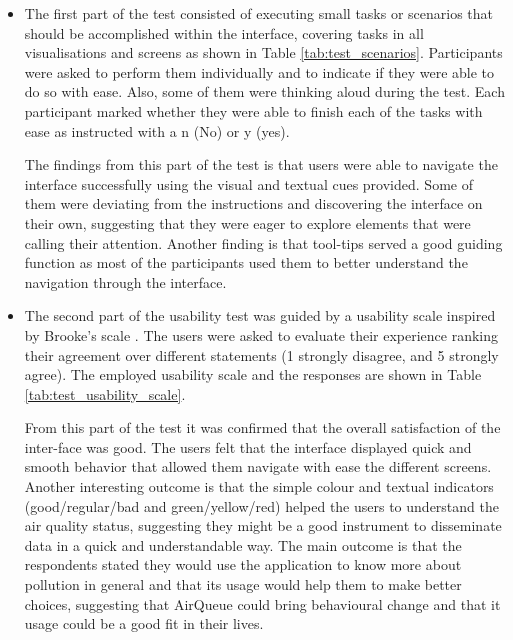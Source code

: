 \begin{itemize}

	\item  The first part of the test consisted of executing small tasks or scenarios that should be accomplished within the interface, covering tasks in all visualisations and screens as shown in Table \ref{tab:test_scenarios}. Participants were asked to perform them individually and to indicate if they were able to do so with ease. Also, some of them were thinking aloud during the test. Each participant marked whether they were able to finish each of the tasks with ease as instructed with a n (No) or y (yes). 

The findings from this part of the test is that users were able to navigate the interface successfully using the visual and textual cues provided. Some of them were deviating from the instructions and discovering the interface on their own, suggesting that they were eager to explore elements that were calling their attention. Another finding is that tool-tips served a good guiding function as most of the participants used them to better understand the navigation through the interface.

	\item The second part of the usability test was guided by a usability scale inspired by Brooke's scale \cite{Brooke1996}. The users were asked to evaluate their experience ranking their agreement over different statements (1 strongly disagree, and 5 strongly agree). The employed usability scale and the responses are shown in Table \ref{tab:test_usability_scale}. 


From this part of the test it was confirmed that the overall satisfaction of the inter-face was good. The users felt that the interface displayed quick and smooth behavior that allowed them navigate with ease the different screens. Another interesting outcome is that the simple colour and textual indicators (good/regular/bad and green/yellow/red) helped the users to understand the air quality status, suggesting they might be a good instrument to disseminate data in a quick and understandable way. The main outcome is that the respondents stated they would use the application to know more about pollution in general and that its usage would help them to make better choices, suggesting that AirQueue could bring behavioural change and that it usage could be a good fit in their lives.

\end{itemize}




